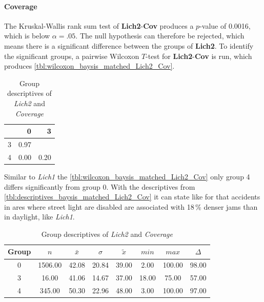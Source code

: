 \paragraph{Coverage}
The Kruskal-Wallis rank sum test of \textbf{Lich2}-\textbf{Cov} produces a $p$-value of 0.0016, which is below $\alpha=.05$. The null hypothesis can therefore be rejected, which means there is a significant difference between the groups of \textbf{Lich2}. To identify the significant groups, a pairwise Wilcoxon $T$-test for \textbf{Lich2}-\textbf{Cov} is run, which produces \autoref{tbl:wilcoxon_baysis_matched_Lich2_Cov}. 
\begin{table}[ht]
	\small
	\centering
    \begin{tabular}{rrr}
        \toprule
        & 0 & 3 \\ 
        \midrule
        3 & 0.97 &  \\ 
        4 & 0.00 & 0.20 \\ 
        \hline
      \end{tabular}
	\caption{Group descriptives of \textit{Lich2} and \textit{Coverage}}
	\label{tbl:wilcoxon_baysis_matched_Lich2_Cov}
\end{table}
Similar to \textit{Lich1} the \autoref{tbl:wilcoxon_baysis_matched_Lich2_Cov} only group 4 differs significantly from group 0. With the descriptives from \autoref{tbl:descriptives_baysis_matched_Lich2_Cov} it can state like for that accidents in ares where street light are disabled are associated with 18\,\% denser jams than in daylight, like \textit{Lich1}.
\begin{table}[ht]
	\small
	\centering
    \begin{tabular}{c|c|c|c|c|c|c|c}
        \toprule
        Group & $n$ & $\bar{x}$ & $\sigma$ & $\tilde{x}$ & $min$ & $max$ & $\Delta$ \\   
        \midrule
        0  & 1506.00 & 42.08 & 20.84 & 39.00 & 2.00 & 100.00 & 98.00 \\ 
        3 & 16.00 & 41.06 & 14.67 & 37.00 & 18.00 & 75.00 & 57.00 \\ 
        4 & 345.00 & 50.30 & 22.96 & 48.00 & 3.00 & 100.00 & 97.00 \\ 
        \bottomrule
      \end{tabular}
	\caption{Group descriptives of \textit{Lich2} and \textit{Coverage}}
	\label{tbl:descriptives_baysis_matched_Lich2_Cov}
\end{table}

